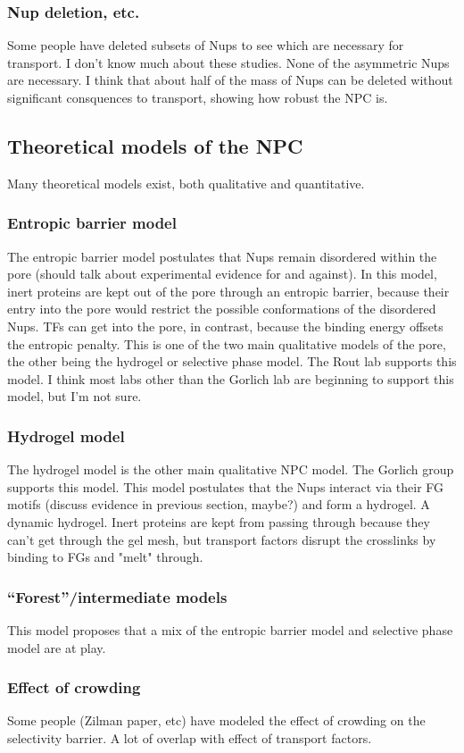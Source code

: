 \subsubsection{Nup deletion, etc.}
Some people have deleted subsets of Nups to see which are necessary for transport.  I don't know much about these studies.  None of the asymmetric Nups are necessary.  I think that about half of the mass of Nups can be deleted without significant consquences to transport, showing how robust the NPC is.
\subsection{Theoretical models of the NPC}
Many theoretical models exist, both qualitative and quantitative.
\subsubsection{Entropic barrier model}
The entropic barrier model postulates that Nups remain disordered within the pore (should talk about experimental evidence for and against).  In this model, inert proteins are kept out of the pore through an entropic barrier, because their entry into the pore would restrict the possible conformations of the disordered Nups.  TFs can get into the pore, in contrast, because the binding energy offsets the entropic penalty.  This is one of the two main qualitative models of the pore, the other being the hydrogel or selective phase model.  The Rout lab supports this model.  I think most labs other than the Gorlich lab are beginning to support this model, but I'm not sure.
\subsubsection{Hydrogel model}
The hydrogel model is the other main qualitative NPC model.  The Gorlich group supports this model.  This model postulates that the Nups interact via their FG motifs (discuss evidence in previous section, maybe?) and form a hydrogel.  A dynamic hydrogel.  Inert proteins are kept from passing through because they can't get through the gel mesh, but transport factors disrupt the crosslinks by binding to FGs and "melt" through.
\subsubsection{“Forest”/intermediate models}
This model proposes that a mix of the entropic barrier model and selective phase model are at play.
\subsubsection{Effect of crowding}
Some people (Zilman paper, etc) have modeled the effect of crowding on the selectivity barrier.  A lot of overlap with effect of transport factors.
